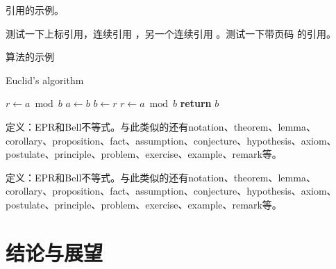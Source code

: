 引用的示例。

测试一下上标引用，连续引用
\cite{newman2001random,aiello2000random,bollobas2001random}，另一个连续引用
\cite{newman2001random,bollobas2001random,barabasi1999emergence}。测试一下带页码
的引用\cite[124--128]{erdHos1961strength}。

算法的示例

\begin{algorithm}
    \caption{Euclid’s algorithm}
    \label{alg:euclid}
    \begin{algorithmic}[1]
        \State $r\gets a\bmod b$
        \State $a\gets b$
        \State $b\gets r$
        \State $r\gets a\bmod b$
        \EndWhile\label{euclidendwhile}
       \State \textbf{return} $b$
       \EndProcedure
   \end{algorithmic}
\end{algorithm}


\begin{definition}
定义：EPR和Bell不等式。与此类似的还有notation、theorem、lemma、corollary、proposition、fact、assumption、conjecture、hypothesis、axiom、postulate、principle、problem、exercise、example、remark等。
\end{definition}
\begin{theorem}
定义：EPR和Bell不等式。与此类似的还有notation、theorem、lemma、corollary、proposition、fact、assumption、conjecture、hypothesis、axiom、postulate、principle、problem、exercise、example、remark等。
\end{theorem}

\section{结论与展望}

\backmatter 

\begin{acknowledgment}%

\end{acknowledgment}



\appendixs{}%


  